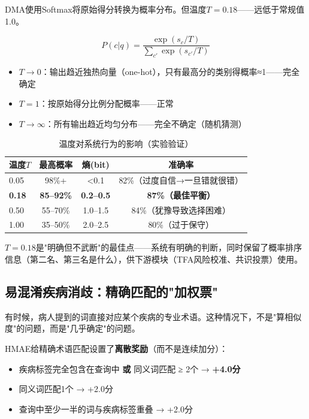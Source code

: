 \documentclass[11pt,a4paper]{ctexart}
\begin{document}
DMA使用Softmax将原始得分转换为概率分布。但温度$T=0.18$——远低于常规值1.0。

\begin{defbox}[温度参数的作用]
$$P(c|q) = \frac{\exp(s_c / T)}{\sum_{c'} \exp(s_{c'} / T)}$$
\begin{itemize}[nosep]
\item $T \to 0$：输出趋近独热向量（one-hot），只有最高分的类别得概率≈1——完全确定
\item $T=1$：按原始得分比例分配概率——正常
\item $T \to \infty$：所有输出趋近均匀分布——完全不确定（随机猜测）
\end{itemize}
\end{defbox}

\begin{table}[H]
\centering
\small
\begin{tabular}{lccc}
\toprule
\textbf{温度$T$} & \textbf{最高概率} & \textbf{熵(bit)} & \textbf{准确率} \\
\midrule
0.05 & 98\%+ & <0.1 & 82\%（过度自信→一旦错就很错）\\
\textbf{0.18} & \textbf{85--92\%} & \textbf{0.2--0.5} & \textbf{87\%（最佳平衡）}\\
0.50 & 55--70\% & 1.0--1.5 & 84\%（犹豫导致选择困难）\\
1.00 & 35--50\% & 2.0--2.5 & 80\%（过于保守）\\
\bottomrule
\end{tabular}
\caption{温度对系统行为的影响（实验验证）}
\end{table}

$T=0.18$是"明确但不武断"的最佳点——系统有明确的判断，同时保留了概率排序信息（第二名、第三名是什么），供下游模块（TFA风险校准、共识投票）使用。

\subsection{易混淆疾病消歧：精确匹配的"加权票"}

有时候，病人提到的词直接对应某个疾病的专业术语。这种情况下，不是"算相似度"的问题，而是"几乎确定"的问题。

HMAE给精确术语匹配设置了\textbf{离散奖励}（而不是连续加分）：

\begin{itemize}[nosep]
\item 疾病标签完全包含在查询中 \textbf{或} 同义词匹配 ≥ 2个 → \textbf{+4.0分}
\item 同义词匹配1个 → +2.0分
\item 查询中至少一半的词与疾病标签重叠 → +2.0分
\end{itemize}
\end{document}
